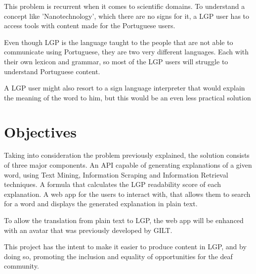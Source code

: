 This problem is recurrent when it comes to scientific domains.
To understand a concept like 'Nanotechnology', which there are no signs for it, a \gls{LGP} user has to access tools with content made for the Portuguese users.

Even though \gls{LGP} is the language taught to the people that are not able to communicate using Portuguese, they are two very different languages.
Each with their own lexicon and grammar, so most of the \gls{LGP} users will struggle to understand Portuguese content.

A \gls{LGP} user might also resort to a sign language interpreter that would explain the meaning of the word to him, but this would be an even less practical solution

\section{Objectives}

Taking into consideration the problem previously explained, the solution consists of three major components.
An \gls{API} capable of generating explanations of a given word, using Text Mining, Information Scraping and Information Retrieval techniques.
A formula that calculates the \gls{LGP} readability score of each explanation.
A web app for the users to interact with, that allows them to search for a word and displays the generated explanation in plain text.

To allow the translation from plain text to \gls{LGP}, the web app will be enhanced with an avatar that was previously developed by \gls{GILT}.

This project has the intent to make it easier to produce content in \gls{LGP}, and by doing so, promoting the inclusion and equality of opportunities for the deaf community.
